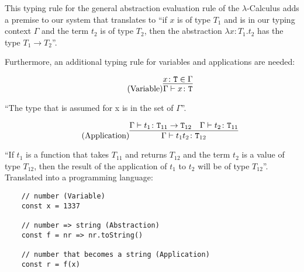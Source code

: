 This typing rule for the general abstraction evaluation rule
of the $\lambda$-Calculus adds
a premise to our system that translates to ``if $x$ is of
type $T_1$ and is in our typing context $\Gamma$ and
the term $t_2$ is of type $T_2$, then the abstraction
$\lambda x \colon T_1 . t_2$ has the type $T_1 \rightarrow T_2$''.

Furthermore, an additional typing rule for variables and applications
are needed:

\begin{equation*}
    \tag{Variable}
    \infer{
        \Gamma \vdash x \colon \texttt{T}
    }{
        x \colon \texttt{T} \in \Gamma
    }
\end{equation*}

``The type that is assumed for x is in the set of $\Gamma$''.

\begin{equation*}
    \tag{Application}
    \infer{
        \Gamma \vdash t_1 t_2 \colon \texttt{T}_{12}
    }{
        \Gamma \vdash t_1 \colon \texttt{T}_{11} \rightarrow \texttt{T}_{12}
        &
        \Gamma \vdash t_2 \colon \texttt{T}_{11}
    }
\end{equation*}

``If $t_1$ is a function that takes $T_{11}$ and returns
$T_{12}$ and the term $t_2$ is a value of type $T_{12}$, then
the result of the application of $t_1$ to $t_2$ will
be of type $T_{12}$''.
\\[12pt]
Translated into a programming language:

\begin{verbatim}
    // number (Variable)
    const x = 1337

    // number => string (Abstraction)
    const f = nr => nr.toString()

    // number that becomes a string (Application)
    const r = f(x)
\end{verbatim}
